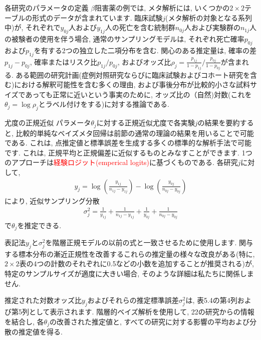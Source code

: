 \documentclass[10pt,dvipdfmx,a4]{beamer}
\newcommand{\eq}[1]{\begin{align}#1\end{align}}
\newcommand{\tcr}[1]{\textcolor{red}{#1}}
\begin{document}

\begin{frame}{各研究のパラメータの定義}
$\beta$阻害薬の例では, メタ解析には, いくつかの$2\times 2$テーブルの形式のデータが含まれています.
臨床試験$j$(メタ解析の対象となる系列中)が, それぞれで$y_{0j}$人および$y_{1j}$人の死亡を含む統制群$n_{0j}$人および実験群の$n_{1j}$人の被験者の使用を伴う場合, 通常のサンプリングモデルは, それぞれ死亡確率$p_{0j}$および$p_{1j}$を有する2つの独立した二項分布を含む.
関心のある推定量は, 確率の差$p_{1j}-p_{0j}$, 確率またはリスク比$p_{1j}/p_{0j}$, およびオッズ比$\rho_j=\tfrac{p_{1j}}{1-p_{1j}}/\tfrac{p_{0j}}{1-p_{0j}}$が含まれる.
ある範囲の研究計画(症例対照研究ならびに臨床試験およびコホート研究を含む)における解釈可能性を含む多くの理由, および事後分布が比較的小さな試料サイズであっても正常に近いという事実のために, オッズ比の（自然)対数(これを$\theta_j=\log\rho_j$とラベル付けをする)に対する推論である.
\end{frame}


\begin{frame}{尤度の正規近似}
パラメータ$\theta_j$に対する正規近似尤度で各実験$j$の結果を要約すると, 比較的単純なベイズメタ回帰は前節の通常の理論の結果を用いることで可能である.
これは, 点推定値と標準誤差を生成する多くの標準的な解析手法で可能です.
これは, 正規平均と正規偏差に近似するものとみなすことができます.
1つのアプローチは\tcr{経験ロジット(emperical logits)}に基づくものである.
各研究$j$に対して, 
\eq{y_j=\log \left(\frac{y_{1j}}{n_{1j}-y_{1j}}\right)-\log \left(\frac{y_{0j}}{n_{0j}-y_{0j}}\right)}
により, 近似サンプリング分散
\eq{\sigma_j^2=\frac{1}{y_{1j}}+\frac{1}{n_{1j}-y_{1j}}+\frac{1}{y_{0j}}+\frac{1}{n_{0j}-y_{0j}}}
で$\theta_j$を推定できる.
\end{frame}


\begin{frame}
表記法$y_j$と$\sigma^2_j$を階層正規モデルの以前の式と一致させるために使用します.
関与する標本分布の漸近正規性を改善するこれらの推定量の様々な改良がある(特に, $2\times2$表の4つの計数のそれぞれに0.5などの小数を追加することが推奨される)が, 特定のサンプルサイズが適度に大きい場合, そのような詳細は私たちに関係しません.

推定された対数オッズ比$y_j$およびそれらの推定標準誤差$\sigma^2_j$は, 表5.4の第4列および第5列として表示されます.
階層的ベイズ解析を使用して, 22の研究からの情報を結合し, 各$\theta_j$の改善された推定値と, すべての研究に対する影響の平均および分散の推定値を得る.
\end{frame}
\end{document}
